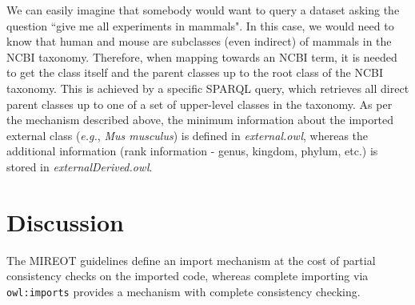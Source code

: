 \documentclass[a4paper,10pt,twocolumn]{article}
\begin{document}


We can easily imagine that somebody would want to query a dataset asking the question ``give me all experiments in mammals".
In this case, we would need to know that human and mouse are subclasses (even indirect) of mammals in the NCBI taxonomy.
Therefore, when mapping towards an NCBI term, it is needed to get the class itself and the parent classes up to the root class of the NCBI taxonomy.
This is achieved by a specific SPARQL query, which retrieves all direct parent classes up to one of a set of upper-level classes in the taxonomy.%
As per the mechanism described above, the minimum information about the imported external class (\emph{e.g.}, \emph{Mus musculus}) is defined in \emph{external.owl}, whereas the additional information (rank information - genus, kingdom, phylum, etc.) is stored in \emph{ externalDerived.owl}. 



\section*{Discussion}

The MIREOT guidelines define an import mechanism at the cost of partial consistency checks on the imported code, whereas complete importing via \texttt{owl:imports} provides a mechanism with complete consistency checking.
\end{document}

